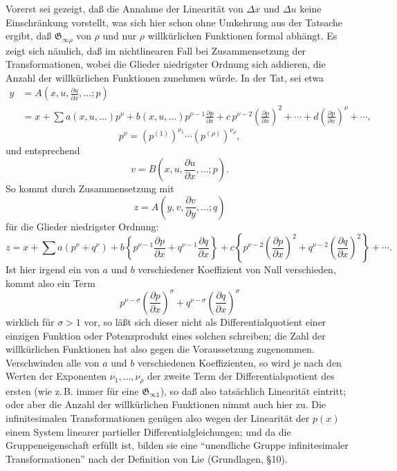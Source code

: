 \documentclass[11pt]{article}
\newcommand{\D}{\Delta}
\providecommand{\G}{\mathfrak G}
\providecommand{\p}{\partial}
\providecommand{\p}{\partial}
\begin{document}
Vorerst sei gezeigt, daß die Annahme der Linearität von \(\D x\) und \(\D u\) keine Einschränkung vorstellt, was sich hier schon ohne Umkehrung aus der Tatsache ergibt, daß \(\G_{\infty\rho}\) von \(\rho\) und nur \(\rho\) willkürlichen Funktionen formal abhängt. Es zeigt sich nämlich, daß im nichtlinearen Fall bei Zusammensetzung der Transformationen, wobei die Glieder niedrigster Ordnung sich addieren, die Anzahl der willkürlichen Funktionen zunehmen würde. In der Tat, sei etwa
\[
\begin{aligned}
y&=A\!\left(x,u,\frac{\p u}{\p x},\ldots;p\right)\\
&=x+\sum a(x,u,\ldots)p^\nu
+b(x,u,\ldots)p^{\nu-1}\frac{\p p}{\p x}
+c\,p^{\nu-2}\left(\frac{\p p}{\p x}\right)^2+\cdots
+d\left(\frac{\p p}{\p x}\right)^\nu+\cdots,
\end{aligned}
\]
\[
p^\nu=(p^{(1)})^{\nu_1}\cdots(p^{(\rho)})^{\nu_\rho},
\]
und entsprechend
\[
v=B\!\left(x,u,\frac{\p u}{\p x},\ldots;p\right).
\]
So kommt durch Zusammensetzung mit
\[
z=A\!\left(y,v,\frac{\p v}{\p y},\ldots;q\right)
\]
für die Glieder niedrigster Ordnung:
\[
z=x+\sum a(p^\nu+q^\nu)+
b\left\{p^{\nu-1}\frac{\p p}{\p x}+q^{\nu-1}\frac{\p q}{\p x}\right\}
+c\left\{p^{\nu-2}\left(\frac{\p p}{\p x}\right)^2
+q^{\nu-2}\left(\frac{\p q}{\p x}\right)^2\right\}+\cdots.
\]
Ist hier irgend ein von \(a\) und \(b\) verschiedener Koeffizient von Null verschieden, kommt also ein Term
\[
p^{\nu-\sigma}\left(\frac{\p p}{\p x}\right)^\sigma
+q^{\nu-\sigma}\left(\frac{\p q}{\p x}\right)^\sigma
\]
wirklich für \(\sigma>1\) vor, so läßt sich dieser nicht als Differentialquotient einer einzigen Funktion oder Potenzprodukt eines solchen schreiben; die Zahl der willkürlichen Funktionen hat also gegen die Voraussetzung zugenommen. Verschwinden alle von \(a\) und \(b\) verschiedenen Koeffizienten, so wird je nach den Werten der Exponenten \(\nu_1,\ldots,\nu_\rho\) der zweite Term der Differentialquotient des ersten (wie z.\,B. immer für eine \(\G_{\infty1}\)), so daß also tatsächlich Linearität eintritt; oder aber die Anzahl der willkürlichen Funktionen nimmt auch hier zu. Die infinitesimalen Transformationen genügen also wegen der Linearität der \(p(x)\) einem System linearer partieller Differentialgleichungen; und da die Gruppeneigenschaft erfüllt ist, bilden sie eine ``unendliche Gruppe infinitesimaler Transformationen'' nach der Definition von Lie (Grundlagen, \S{}10).
\end{document}
